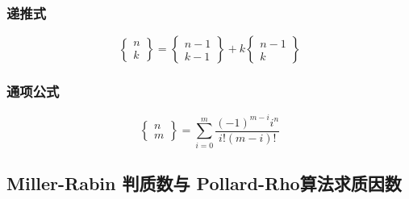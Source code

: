 \documentclass[]{article}
\begin{document}
\hypertarget{ux9012ux63a8ux5f0f}{%
\subsubsection{递推式}\label{ux9012ux63a8ux5f0f}}

\[
\begin{Bmatrix}n\\ k\end{Bmatrix}=\begin{Bmatrix}n-1\\ k-1\end{Bmatrix}+k\begin{Bmatrix}n-1\\ k\end{Bmatrix}
\]

\hypertarget{ux901aux9879ux516cux5f0f}{%
\subsubsection{通项公式}\label{ux901aux9879ux516cux5f0f}}

\[
\begin{Bmatrix}n\\m\end{Bmatrix}=\sum\limits_{i=0}^m\dfrac{(-1)^{m-i}i^n}{i!(m-i)!}
\]

\hypertarget{miller-rabin-ux5224ux8d28ux6570ux4e0e-pollard-rhoux7b97ux6cd5ux6c42ux8d28ux56e0ux6570}{%
\subsection{Miller-Rabin 判质数与
Pollard-Rho算法求质因数}\label{miller-rabin-ux5224ux8d28ux6570ux4e0e-pollard-rhoux7b97ux6cd5ux6c42ux8d28ux56e0ux6570}}
\end{document}
